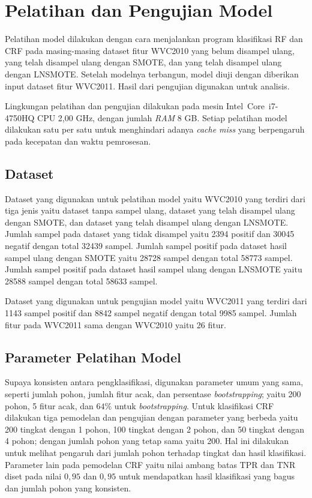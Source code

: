 \chapter{Pelatihan dan Pengujian Model}

Pelatihan model dilakukan dengan cara menjalankan program klasifikasi RF dan
CRF pada masing-masing dataset fitur WVC2010 yang belum disampel ulang, yang
telah disampel ulang dengan SMOTE, dan yang telah disampel ulang dengan
LNSMOTE.
Setelah modelnya terbangun, model diuji dengan diberikan input dataset fitur
WVC2011. Hasil dari pengujian digunakan untuk analisis.

Lingkungan pelatihan dan pengujian dilakukan pada mesin Intel\textregistered\
 Core\texttrademark \ i7-4750HQ CPU 2,00 GHz, dengan jumlah \textit{RAM} 8
GB. Setiap pelatihan model dilakukan satu per satu untuk menghindari adanya
\textit{cache miss} yang berpengaruh pada kecepatan dan waktu pemrosesan.

\section{Dataset}

Dataset yang digunakan untuk pelatihan model yaitu WVC2010 yang terdiri dari
tiga jenis yaitu dataset tanpa sampel ulang, dataset yang telah disampel ulang
dengan SMOTE, dan dataset yang telah disampel ulang dengan LNSMOTE.
Jumlah sampel pada dataset yang tidak disampel yaitu 2394 positif dan 30045
negatif dengan total 32439 sampel.
Jumlah sampel positif pada dataset hasil sampel ulang dengan SMOTE yaitu 28728
sampel dengan total 58773 sampel.
Jumlah sampel positif pada dataset hasil sampel ulang dengan LNSMOTE yaitu
28588 sampel dengan total 58633 sampel.

Dataset yang digunakan untuk pengujian model yaitu WVC2011 yang terdiri dari
1143 sampel positif dan 8842 sampel negatif dengan total 9985 sampel.
Jumlah fitur pada WVC2011 sama dengan WVC2010 yaitu 26 fitur.

\section{Parameter Pelatihan Model}

Supaya konsisten antara pengklasifikasi, digunakan parameter umum yang sama,
seperti jumlah pohon, jumlah fitur acak, dan persentase \textit{bootstrapping};
yaitu 200 pohon, 5 fitur acak, dan $ 64\% $ untuk \textit{bootstrapping}.
Untuk klasifikasi CRF dilakukan tiga pemodelan dan pengujian dengan parameter
yang berbeda yaitu 200 tingkat dengan 1 pohon, 100 tingkat dengan 2 pohon, dan
50 tingkat dengan 4 pohon; dengan jumlah pohon yang tetap sama yaitu 200.
Hal ini dilakukan untuk melihat pengaruh dari jumlah pohon terhadap tingkat dan
hasil klasifikasi.
Parameter lain pada pemodelan CRF yaitu nilai ambang batas TPR dan TNR diset
pada nilai $0,95$ dan $0,95$ untuk mendapatkan hasil klasifikasi yang bagus dan
jumlah pohon yang konsisten.

